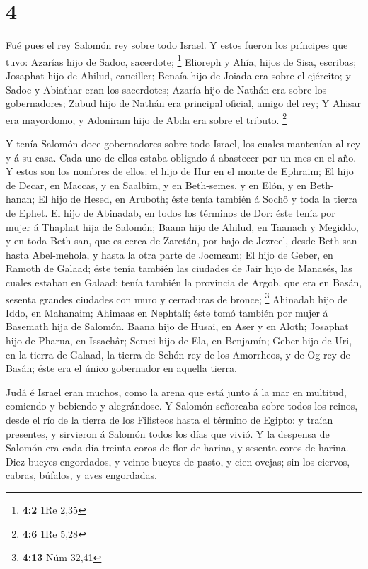 \hypertarget{section-3}{%
\section{4}\label{section-3}}

 Fué pues el rey Salomón rey sobre todo Israel. 
Y estos fueron los príncipes que tuvo: Azarías hijo de Sadoc, sacerdote;
\footnote{\textbf{4:2} 1Re 2,35}  Elioreph y Ahía, hijos de
Sisa, escribas; Josaphat hijo de Ahilud, canciller;  Benaía
hijo de Joiada era sobre el ejército; y Sadoc y Abiathar eran los
sacerdotes;  Azaría hijo de Nathán era sobre los
gobernadores; Zabud hijo de Nathán era principal oficial, amigo del rey;
 Y Ahisar era mayordomo; y Adoniram hijo de Abda era sobre
el tributo. \footnote{\textbf{4:6} 1Re 5,28}

 Y tenía Salomón doce gobernadores sobre todo Israel, los
cuales mantenían al rey y á su casa. Cada uno de ellos estaba obligado á
abastecer por un mes en el año.  Y estos son los nombres de
ellos: el hijo de Hur en el monte de Ephraim;  El hijo de
Decar, en Maccas, y en Saalbim, y en Beth-semes, y en Elón, y en
Beth-hanan;  El hijo de Hesed, en Aruboth; éste tenía
también á Sochô y toda la tierra de Ephet.  El hijo de
Abinadab, en todos los términos de Dor: éste tenía por mujer á Thaphat
hija de Salomón;  Baana hijo de Ahilud, en Taanach y
Megiddo, y en toda Beth-san, que es cerca de Zaretán, por bajo de
Jezreel, desde Beth-san hasta Abel-mehola, y hasta la otra parte de
Jocmeam;  El hijo de Geber, en Ramoth de Galaad; éste tenía
también las ciudades de Jair hijo de Manasés, las cuales estaban en
Galaad; tenía también la provincia de Argob, que era en Basán, sesenta
grandes ciudades con muro y cerraduras de bronce; \footnote{\textbf{4:13}
  Núm 32,41}  Ahinadab hijo de Iddo, en Mahanaim;
 Ahimaas en Nephtalí; éste tomó también por mujer á
Basemath hija de Salomón.  Baana hijo de Husai, en Aser y
en Aloth;  Josaphat hijo de Pharua, en Issachâr;
 Semei hijo de Ela, en Benjamín;  Geber hijo
de Uri, en la tierra de Galaad, la tierra de Sehón rey de los Amorrheos,
y de Og rey de Basán; éste era el único gobernador en aquella tierra.

 Judá é Israel eran muchos, como la arena que está junto á
la mar en multitud, comiendo y bebiendo y alegrándose.  Y
Salomón señoreaba sobre todos los reinos, desde el río de la tierra de
los Filisteos hasta el término de Egipto: y traían presentes, y
sirvieron á Salomón todos los días que vivió.  Y la
despensa de Salomón era cada día treinta coros de flor de harina, y
sesenta coros de harina.  Diez bueyes engordados, y veinte
bueyes de pasto, y cien ovejas; sin los ciervos, cabras, búfalos, y aves
engordadas.

